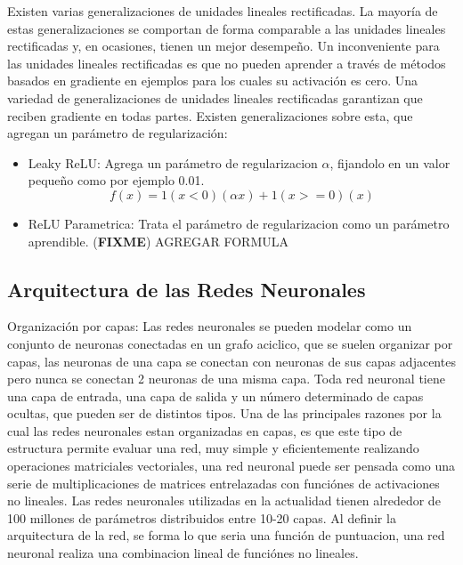\documentclass[a4paper,11pt,spanish]{book}
\newcommand*{\FIXME}[1]{{(\textbf{FIXME}) {#1}}}
\begin{document}
	    Existen varias generalizaciones de unidades lineales rectificadas. La mayoría de estas generalizaciones se comportan de forma comparable a las unidades lineales rectificadas
	    y, en ocasiones, tienen un mejor desempeño. Un inconveniente para las unidades lineales rectificadas es que no pueden aprender a través de métodos basados ​​en
	    gradiente en ejemplos para los cuales su activación es cero. Una variedad de generalizaciones de unidades lineales rectificadas garantizan que reciben gradiente en
	    todas partes. Existen generalizaciones sobre esta, que agregan un parámetro de regularización:
	    \begin{itemize}
	      \item Leaky ReLU: Agrega un parámetro de regularizacion $\alpha$, fijandolo en un valor pequeño como por ejemplo 0.01.
		\begin{equation}
		  f(x)=1(x<0)(\alpha x)+1(x>=0)(x)
		\end{equation}
	      \item ReLU Parametrica: Trata el parámetro de regularizacion como un parámetro aprendible. \FIXME{AGREGAR FORMULA}
	    \end{itemize}

    \subsection {Arquitectura de las Redes Neuronales}
      Organización por capas: Las redes neuronales se pueden modelar como un conjunto de neuronas conectadas en un grafo aciclico, que se suelen organizar por capas, las neuronas de una capa
      se conectan con neuronas de sus capas adjacentes pero nunca se conectan 2 neuronas de una misma capa.
      Toda red neuronal tiene una capa de entrada, una capa de salida y un número determinado de capas ocultas, que pueden ser de distintos tipos.
      Una de las principales razones por la cual las redes neuronales estan organizadas en capas, es que este tipo de estructura permite evaluar una red, muy simple y eficientemente realizando
      operaciones matriciales vectoriales, una red neuronal puede ser pensada como una serie de multiplicaciones de matrices entrelazadas con funciónes de activaciones no lineales.
      Las redes neuronales utilizadas en la actualidad tienen alrededor de 100 millones de parámetros distribuidos entre 10-20 capas.
      Al definir la arquitectura de la red, se forma lo que seria una función de puntuacion, una red neuronal realiza una combinacion lineal de funciónes no lineales.
\end{document}
